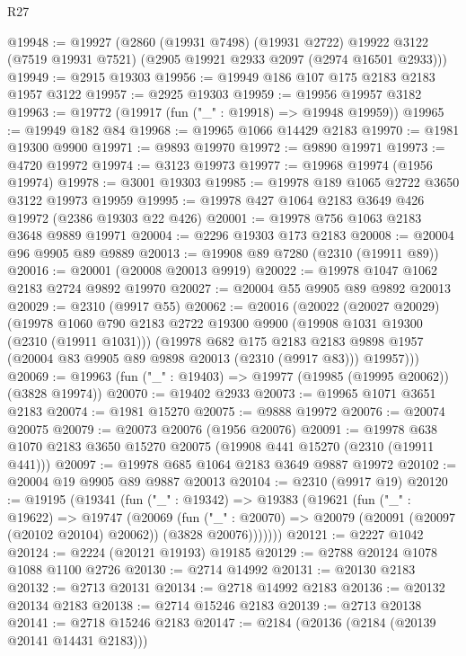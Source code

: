 \begin{lexlean}{R27}
\begin{coremodule}
@19948 := @19927
    (@2860
      (@19931 @7498)
      (@19931 @2722)
      @19922
      @3122
      (@7519 @19931 @7521)
      (@2905 @19921 @2933 @2097 (@2974 @16501 @2933)))
@19949 := @2915 @19303
@19956 := @19949 @186 @107 @175 @2183 @2183 @1957 @3122
@19957 := @2925 @19303
@19959 := @19956 @19957 @3182
@19963 := @19772 (@19917 (fun ("_" : @19918) => @19948 @19959))
@19965 := @19949 @182 @84
@19968 := @19965 @1066 @14429 @2183
@19970 := @1981 @19300 @9900
@19971 := @9893 @19970
@19972 := @9890 @19971
@19973 := @4720 @19972
@19974 := @3123 @19973
@19977 := @19968 @19974 (@1956 @19974)
@19978 := @3001 @19303
@19985 := @19978 @189 @1065 @2722 @3650 @3122 @19973 @19959
@19995 := @19978 @427 @1064 @2183 @3649 @426 @19972 (@2386 @19303 @22 @426)
@20001 := @19978 @756 @1063 @2183 @3648 @9889 @19971
@20004 := @2296 @19303 @173 @2183
@20008 := @20004 @96 @9905 @89 @9889
@20013 := @19908 @89 @7280 (@2310 (@19911 @89))
@20016 := @20001 (@20008 @20013 @9919)
@20022 := @19978 @1047 @1062 @2183 @2724 @9892 @19970
@20027 := @20004 @55 @9905 @89 @9892 @20013
@20029 := @2310 (@9917 @55)
@20062 := @20016
    (@20022
      (@20027 @20029)
      (@19978
        @1060
        @790
        @2183
        @2722
        @19300
        @9900
        (@19908 @1031 @19300 (@2310 (@19911 @1031)))
        (@19978
          @682
          @175
          @2183
          @2183
          @9898
          @1957
          (@20004 @83 @9905 @89 @9898 @20013 (@2310 (@9917 @83)))
          @19957)))
@20069 := @19963 (fun ("_" : @19403) => @19977 (@19985 (@19995 @20062)) (@3828 @19974))
@20070 := @19402 @2933
@20073 := @19965 @1071 @3651 @2183
@20074 := @1981 @15270
@20075 := @9888 @19972
@20076 := @20074 @20075
@20079 := @20073 @20076 (@1956 @20076)
@20091 := @19978 @638 @1070 @2183 @3650 @15270 @20075 (@19908 @441 @15270 (@2310 (@19911 @441)))
@20097 := @19978 @685 @1064 @2183 @3649 @9887 @19972
@20102 := @20004 @19 @9905 @89 @9887 @20013
@20104 := @2310 (@9917 @19)
@20120 := @19195
    (@19341
      (fun ("_" : @19342) =>
      @19383
        (@19621
          (fun ("_" : @19622) =>
          @19747
            (@20069
              (fun ("_" : @20070) =>
              @20079 (@20091 (@20097 (@20102 @20104) @20062)) (@3828 @20076)))))))
@20121 := @2227 @1042
@20124 := @2224 (@20121 @19193) @19185
@20129 := @2788 @20124 @1078 @1088 @1100 @2726
@20130 := @2714 @14992
@20131 := @20130 @2183
@20132 := @2713 @20131
@20134 := @2718 @14992 @2183
@20136 := @20132 @20134 @2183
@20138 := @2714 @15246 @2183
@20139 := @2713 @20138
@20141 := @2718 @15246 @2183
@20147 := @2184 (@20136 (@2184 (@20139 @20141 @14431 @2183)))

\end{coremodule}
\end{lexlean}
